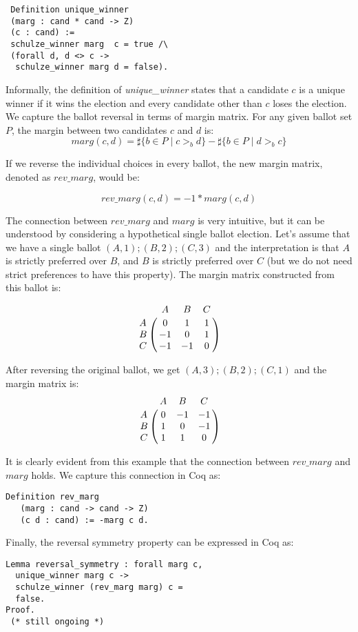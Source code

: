 \documentclass[compsoc,conference,a4paper,10pt,times]{IEEEtran}
\begin{document}
 \begin{verbatim}
 Definition unique_winner 
 (marg : cand * cand -> Z) 
 (c : cand) :=
 schulze_winner marg  c = true /\
 (forall d, d <> c -> 
  schulze_winner marg d = false).
\end{verbatim}  
\noindent
Informally, the definition of \textit{unique\_winner} states that a 
candidate $c$ is a unique winner
if it wins the election and every candidate 
other than $c$ loses the election.
We capture the ballot reversal in terms of margin matrix. For any given ballot set $P$, 
the margin between two candidates $c$ and $d$ is: 
\[
  marg(c, d) = \sharp \lbrace b \in P \mid c >_b d \rbrace -
            \sharp \lbrace b \in P \mid d >_b c \rbrace
\] 

\noindent
If we reverse the individual choices in every ballot, the new margin matrix, denoted as $rev\_marg$, would be:

\[
  rev\_marg(c, d) = -1 * marg (c, d)  
\]    

\noindent
The connection between $rev\_marg$ and $marg$ is very intuitive, but it can be understood 
by considering a hypothetical single ballot election. Let's assume that we have 
a single ballot $(A, 1); (B, 2); (C, 3)$ and the interpretation is 
that $A$ is strictly preferred over $B$, and $B$ is strictly preferred over $C$ 
(but we do not need strict preferences to have this property).  The margin matrix
constructed from this ballot is: 

\[
\bordermatrix{ & A & B & C \cr
      A & 0 & 1 & 1 \cr
      B & -1 & 0 & 1 \cr
      C & -1 & -1 & 0 }
      \]
    
\noindent      
After reversing the original ballot, we get $(A, 3); (B, 2); (C, 1)$ and 
the margin matrix is:
\[
\bordermatrix{ & A & B & C \cr
      A & 0 & -1 & -1 \cr
      B & 1 & 0 & -1 \cr
      C & 1 & 1 & 0 }
      \]


\noindent
It is clearly evident from this example that the 
connection between $rev\_marg$ and $marg$  holds.
We capture this connection in Coq as:

\begin{verbatim}
Definition rev_marg 
   (marg : cand -> cand -> Z) 
   (c d : cand) := -marg c d.
\end{verbatim}

\noindent


Finally, the reversal symmetry property can be expressed in Coq as: 
\begin{verbatim}
Lemma reversal_symmetry : forall marg c, 
  unique_winner marg c ->
  schulze_winner (rev_marg marg) c = 
  false.
Proof. 
 (* still ongoing *)
\end{verbatim}
\end{document}
